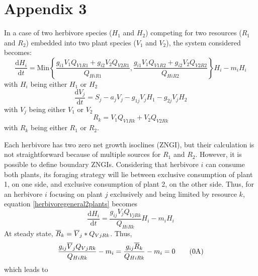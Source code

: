 \documentclass[12pt]{article}
\newcommand\equa[1]{\frac{\mathrm{d}#1}{\mathrm{d}t}}
\newcommand\barre[1]{\overline{\rule{0pt}{1.5ex}#1}}
\begin{document}
\section*{Appendix 3}
In a case of two herbivore species ($H_1$ and $H_2$) competing for two resources ($R_1$ and $R_2$) embedded into two plant species ($V_1$ and $V_2$), the system considered becomes:
\begin{equation}\label{herbivoregeneral2plants}
\equa{H_i}= \text{Min} \left \lbrace \frac{g_{i1}V_1Q_{V1R1}+g_{i2}V_2Q_{V2R1}}{Q_{HiR1}}, \frac{g_{i1}V_1Q_{V1R2}+g_{i2}V_2Q_{V2R2}}{Q_{HiR2}}  \right \rbrace H_i -m_i H_i \tag{\theequation A}
\end{equation}
with $H_i$ being either $H_1$ or $H_2$
\begin{equation}
\equa{V_j}=S_j-a_jV_j-g_{1j}V_jH_1-g_{2j}V_jH_2 \tag{\theequation A}
\end{equation} 
with $V_j$ being either $V_1$ or $V_2$
\begin{equation}
R_k=V_1 Q_{V1Rk} +V_2 Q_{V2Rk} \tag{\theequation A}
\end{equation} 
with $R_k$ being either $R_1$ or $R_2$.
\par
Each herbivore has two zero net growth isoclines (ZNGI), but their calculation is not straightforward because of multiple sources for $R_1$ and $R_2$. However, it is possible to define boundary ZNGIs. Considering that herbivore $i$ can consume both plants, its foraging strategy will lie between exclusive consumption of plant 1, on one side, and exclusive consumption of plant 2, on the other side. Thus, for an herbivore $i$ focusing on plant $j$ exclusively and being limited by resource $k$, equation \ref{herbivoregeneral2plants} becomes 
\begin{equation}
\equa{H_i}=\frac{\displaystyle g_{ij} V_j Q_{VjRk}}{Q_{HiRk}}H_i   -m_i H_i \tag{\theequation A}
\end{equation}
At steady state, $\barre{R}_k=\barre{V}_j*Q_{VjRk}$. Thus,
\begin{equation}
\frac{\displaystyle g_{ij} \barre{V}_j Q_{VjRk}}{Q_{HiRk}}   -m_i =\frac{\displaystyle g_{ij} \barre{R}_k}{Q_{HiRk}}   -m_i=0 \tag{\theequation A}
\end{equation}
which leads to
\end{document}
